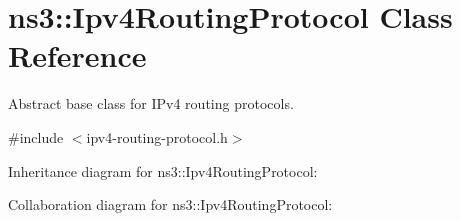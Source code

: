 \hypertarget{classns3_1_1Ipv4RoutingProtocol}{}\section{ns3\+:\+:Ipv4\+Routing\+Protocol Class Reference}
\label{classns3_1_1Ipv4RoutingProtocol}


Abstract base class for I\+Pv4 routing protocols.  




{\ttfamily \#include $<$ipv4-\/routing-\/protocol.\+h$>$}



Inheritance diagram for ns3\+:\+:Ipv4\+Routing\+Protocol\+:


Collaboration diagram for ns3\+:\+:Ipv4\+Routing\+Protocol\+:
